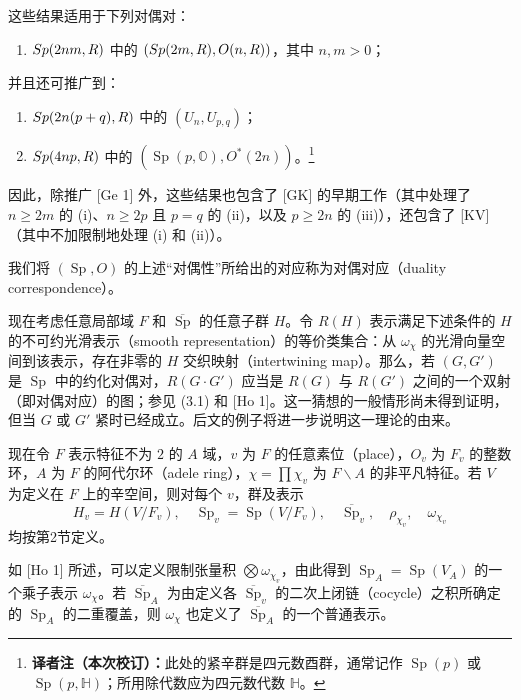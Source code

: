 这些结果适用于下列对偶对：
\begin{enumerate}
\item[(i)] $Sp(2nm,R)$ 中的 $(Sp(2m,R),O(n,R))$，其中 $n,m>0$；
\end{enumerate}
并且还可推广到：
\begin{enumerate}
\item[(ii)] $Sp(2n(p+q),R)$ 中的 $(U_n,U_{p,q})$；
\item[(iii)] $Sp(4np,R)$ 中的 $(\operatorname{Sp}(p,\mathbb O),O^*(2n))$。\footnote{\textbf{译者注（本次校订）：}此处的紧辛群是四元数酉群，通常记作 $\operatorname{Sp}(p)$ 或 $\operatorname{Sp}(p,\mathbb H)$；所用除代数应为四元数代数 $\mathbb H$。}
\end{enumerate}
因此，除推广 [Ge 1] 外，这些结果也包含了 [GK] 的早期工作（其中处理了 $n\ge2m$ 的 (i)、$n\ge2p$ 且 $p=q$ 的 (ii)，以及 $p\ge2n$ 的 (iii)），还包含了 [KV]（其中不加限制地处理 (i) 和 (ii)）。

我们将 $(\operatorname{Sp},O)$ 的上述“对偶性”所给出的对应称为对偶对应（duality correspondence）。

现在考虑任意局部域 $F$ 和 $\overline{\operatorname{Sp}}$ 的任意子群 $H$。令 $R(H)$ 表示满足下述条件的 $H$ 的不可约光滑表示（smooth representation）的等价类集合：从 $\omega_\chi$ 的光滑向量空间到该表示，存在非零的 $H$ 交织映射（intertwining map）。那么，若 $(G,G')$ 是 $\operatorname{Sp}$ 中的约化对偶对，$R(G\cdot G')$ 应当是 $R(G)$ 与 $R(G')$ 之间的一个双射（即对偶对应）的图；参见 (3.1) 和 [Ho 1]。这一猜想的一般情形尚未得到证明，但当 $G$ 或 $G'$ 紧时已经成立。后文的例子将进一步说明这一理论的由来。

现在令 $F$ 表示特征不为 $2$ 的 $A$ 域，$v$ 为 $F$ 的任意素位（place），$O_v$ 为 $F_v$ 的整数环，$A$ 为 $F$ 的阿代尔环（adele ring），$\chi=\prod\chi_v$ 为 $F\backslash A$ 的非平凡特征。若 $V$ 为定义在 $F$ 上的辛空间，则对每个 $v$，群及表示
\[
 H_v=H(V/F_v),\quad\operatorname{Sp}_v=\operatorname{Sp}(V/F_v),
 \quad\overline{\operatorname{Sp}}_v,\quad\rho_{\chi_v},\quad\omega_{\chi_v}
\]
均按第2节定义。

如 [Ho 1] 所述，可以定义限制张量积 $\bigotimes\omega_{\chi_v}$，由此得到 $\operatorname{Sp}_A=\operatorname{Sp}(V_A)$ 的一个乘子表示 $\omega_\chi$。若 $\overline{\operatorname{Sp}}_A$ 为由定义各 $\overline{\operatorname{Sp}}_v$ 的二次上闭链（cocycle）之积所确定的 $\operatorname{Sp}_A$ 的二重覆盖，则 $\omega_\chi$ 也定义了 $\overline{\operatorname{Sp}}_A$ 的一个普通表示。

